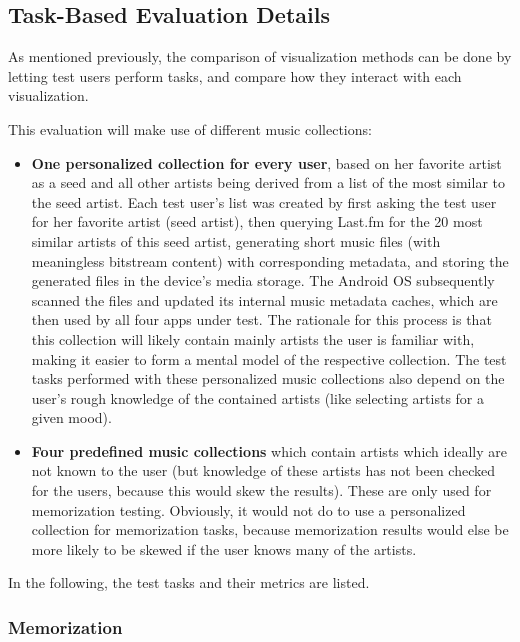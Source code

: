 \subsection{Task-Based Evaluation Details}
\label{subsec:task-based-evaluation}

As mentioned previously, the comparison of visualization methods can be done by letting test users perform tasks, and compare how they interact with each visualization. 

This evaluation will make use of different music collections:

\begin{itemize}
	\item \textbf{One personalized collection for every user}, based on her favorite artist as a seed and all other artists being derived from a list of the most similar to the seed artist. Each test user's list was created by first asking the test user for her favorite artist (seed artist), then querying Last.fm for the 20 most similar artists of this seed artist, generating short music files (with meaningless bitstream content) with corresponding metadata, and storing the generated files in the device's media storage. The Android OS subsequently scanned the files and updated its internal music metadata caches, which are then used by all four apps under test. The rationale for this process is that this collection will likely contain mainly artists the user is familiar with, making it easier to form a mental model of the respective collection. The test tasks performed with these personalized music collections also depend on the user's rough knowledge of the contained artists (like selecting artists for a given mood).
	\item \textbf{Four predefined music collections} which contain artists which ideally are not known to the user (but knowledge of these artists has not been checked for the users, because this would skew the results). These are only used for memorization testing. Obviously, it would not do to use a personalized collection for memorization tasks, because memorization results would else be more likely to be skewed if the user knows many of the artists.
\end{itemize}

In the following, the test tasks and their metrics are listed. 


\subsubsection{Memorization}


